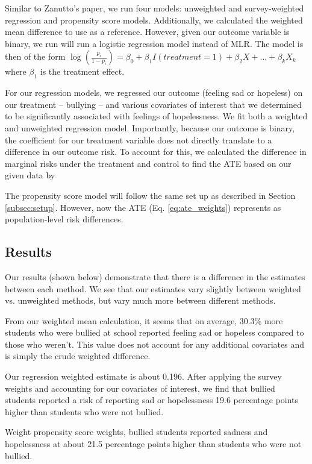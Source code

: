 \documentclass[12pt]{article}
\begin{document}
Similar to Zanutto's paper, we run four models: unweighted and survey-weighted regression and propensity score models. Additionally, we calculated the weighted mean difference to use as a reference. However, given our outcome variable is binary, we run will run a logistic regression model instead of MLR. The model is then of the form $\log(\frac{p_i}{1-p_i}) = \beta_0 + \beta_1I(treatment = 1) + \beta_2X + ... + \beta_kX_k$ where $\beta_1$ is the treatment effect. 

For our regression models, we regressed our outcome (feeling sad or hopeless) on our treatment -- bullying -- and various covariates of interest that we determined to be significantly associated with feelings of hopelessness. We fit both a weighted and unweighted regression model. Importantly, because our outcome is binary, the coefficient for our treatment variable does not directly translate to a difference in our outcome risk. To account for this, we calculated the difference in marginal risks under the treatment and control to find the ATE based on our given data by 

The propensity score model will follow the same set up as described in Section \ref{subsec:setup}. However, now the ATE (Eq. \ref{eq:ate_weights}) represents as population-level risk differences.


\subsection{Results} \label{subsec:ExtResults}

Our results (shown below) demonstrate that there is a difference in the estimates between each method. We see that our estimates vary slightly between weighted vs. unweighted methods, but vary much more between different methods.



From our weighted mean calculation, it seems that on average, 30.3\% more students who were bullied at school reported feeling sad or hopeless compared to those who weren't. This value does not account for any additional covariates and is simply the crude weighted difference.

Our regression weighted estimate is about 0.196. After applying the survey weights and accounting for our covariates of interest, we find that bullied students reported a risk of reporting sad or hopelessness 19.6 percentage points higher than students who were not bullied.

Weight propensity score weights, bullied students reported sadness and hopelessness at about 21.5 percentage points higher than students who were not bullied.
\end{document}
